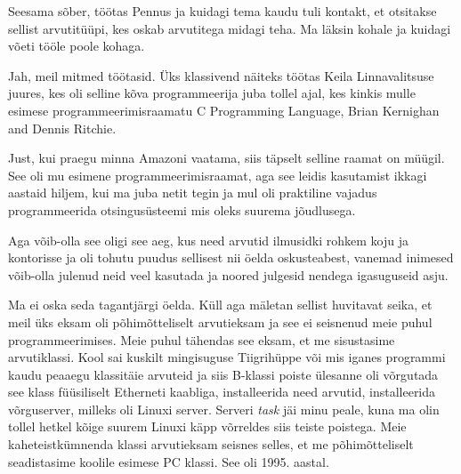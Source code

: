 
Seesama sõber, töötas Pennus ja kuidagi tema kaudu tuli kontakt, et otsitakse sellist arvutitüüpi, kes oskab arvutitega midagi teha. Ma läksin kohale  ja kuidagi võeti tööle poole kohaga.


Jah, meil mitmed töötasid. Üks klassivend näiteks töötas Keila Linnavalitsuse juures, kes oli selline kõva programmeerija juba tollel ajal, kes kinkis mulle esimese programmeerimisraamatu C Programming Language, Brian Kernighan and Dennis Ritchie.


Just, kui praegu minna Amazoni vaatama, siis täpselt selline raamat on müügil. See oli mu esimene programmeerimisraamat, aga see leidis kasutamist ikkagi aastaid hiljem, kui ma juba netit tegin ja mul oli praktiline vajadus programmeerida otsingusüsteemi mis oleks suurema jõudlusega.


Aga võib-olla see oligi see aeg, kus need arvutid ilmusidki rohkem koju ja kontorisse ja oli tohutu puudus sellisest nii öelda oskusteabest, vanemad inimesed võib-olla julenud neid veel kasutada ja noored julgesid nendega  igasuguseid asju.


Ma ei oska seda tagantjärgi öelda. Küll aga mäletan sellist huvitavat seika, et meil üks  eksam oli põhimõtteliselt arvutieksam ja see ei seisnenud meie puhul programmeerimises. Meie puhul tähendas see eksam, et  me sisustasime arvutiklassi.  Kool sai kuskilt mingisuguse Tiigrihüppe või  mis iganes programmi kaudu peaaegu klassitäie arvuteid ja siis B-klassi poiste ülesanne oli võrgutada see klass füüsiliselt Etherneti kaabliga, installeerida need arvutid, installeerida võrguserver, milleks oli  Linuxi server. Serveri \emph{task} jäi minu peale, kuna ma olin tollel hetkel kõige suurem Linuxi käpp võrreldes siis teiste poistega.  Meie kaheteistkümnenda klassi arvutieksam seisnes selles, et me põhimõtteliselt seadistasime koolile esimese PC klassi. See oli 1995. aastal.


